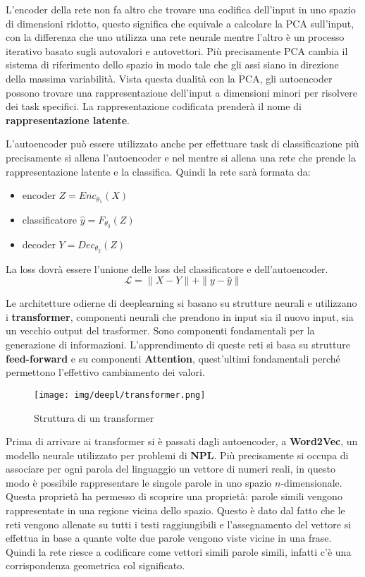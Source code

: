 L'encoder della rete non fa altro che trovare una codifica dell'input in uno spazio
di dimensioni ridotto, questo significa che equivale a calcolare la PCA sull'input,
con la differenza che uno utilizza una rete neurale mentre l'altro è un processo
iterativo basato sugli autovalori e autovettori. Più precisamente PCA cambia il
sistema di riferimento dello spazio in modo tale che gli assi siano in direzione
della massima variabilità. Vista questa dualità con la PCA, gli autoencoder possono
trovare una rappresentazione dell'input a dimensioni minori per risolvere dei task
specifici. La rappresentazione codificata prenderà il nome di \textbf{rappresentazione
      latente}.

L'autoencoder può essere utilizzato anche per effettuare task di classificazione
più precisamente si allena l'autoencoder e nel mentre si allena una rete che prende
la rappresentazione latente e la classifica. Quindi la rete sarà formata da:
\begin{itemize}
      \item encoder $Z = Enc_{\theta_1}(X)$
      \item classificatore $ \hat{y} = F_{\theta_3}(Z)$
      \item decoder $Y = Dec_{\theta_2}(Z)$
\end{itemize}
La loss dovrà essere l'unione delle loss del classificatore e dell'autoencoder.
\begin{equation}
      \mathcal{L} = \| X - Y \| + \| y - \hat{y} \|
\end{equation}

Le architetture odierne di deeplearning si basano su strutture neurali e utilizzano i
\textbf{transformer}, componenti neurali che prendono in input sia il nuovo input,
sia un vecchio output del trasformer. Sono componenti fondamentali per la generazione
di informazioni. L'apprendimento di queste reti si basa su strutture \textbf{feed-forward}
e su componenti \textbf{Attention}, quest'ultimi fondamentali perché permettono
l'effettivo cambiamento dei valori.
\begin{figure}[!ht]
      \centering
      \texttt{[image: img/deepl/transformer.png]}
      \caption{Struttura di un transformer}
      \label{fig:transformer}
\end{figure}
Prima di arrivare ai transformer si è passati dagli autoencoder, a \textbf{Word2Vec},
un modello neurale utilizzato per problemi di \textbf{NPL}. Più precisamente si occupa
di associare per ogni parola del linguaggio un vettore di numeri reali, in questo
modo è possibile rappresentare le singole parole in uno spazio $n$-dimensionale.
Questa proprietà ha permesso di scoprire una proprietà: parole simili vengono
rappresentate in una regione vicina dello spazio. Questo è dato dal fatto che
le reti vengono allenate su tutti i testi raggiungibili e l'assegnamento del vettore
si effettua in base a quante volte due parole vengono viste vicine in una frase.
Quindi la rete riesce a codificare come vettori simili parole simili, infatti c'è
una corrispondenza geometrica col significato.

